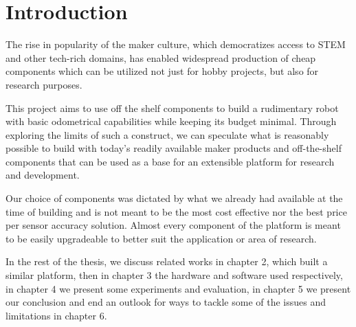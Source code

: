 \documentclass[class=article, crop=false]{standalone}
\begin{document}
\chapter{Introduction}\label{cha:introduction}

The rise in popularity of the maker culture, which democratizes access to STEM and other tech-rich domains, has enabled widespread production of cheap components which can be utilized not just for hobby projects, but also for research purposes.

This project aims to use off the shelf components to build a rudimentary robot with basic odometrical capabilities while keeping its budget minimal. Through exploring the limits of such a construct, we can speculate what is reasonably possible to build with today's readily available maker products and off-the-shelf components that can be used as a base for an extensible platform for research and development.

Our choice of components was dictated by what we already had available at the time of building and is not meant to be the most cost effective nor the best price per sensor accuracy solution. Almost every component of the platform is meant to be easily upgradeable to better suit the application or area of research.

In the rest of the thesis, we discuss related works in chapter 2, which built a similar platform, then in chapter 3 the hardware and software used respectively, in chapter 4 we present some experiments and evaluation, in chapter 5 we present our conclusion and end an outlook for ways to tackle some of the issues and limitations in chapter 6.
\end{document}
